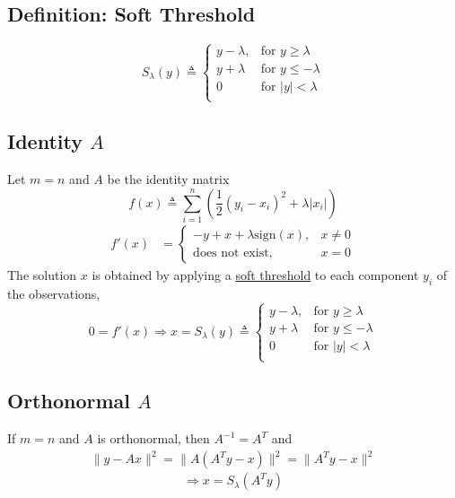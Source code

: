 \documentclass[11pt]{elegantbook}
\begin{document}
\subsection{Definition: Soft Threshold}
\begin{definition}
    $$S_\lambda (y)\triangleq\left\{\begin{matrix}
        y-\lambda,&\text{for }y\geq \lambda\\
        y+\lambda&\text{for }y\leq -\lambda\\
        0&\text{for }|y|< \lambda\\
    \end{matrix}\right.$$
\end{definition}
\subsection{Identity $A$}
Let $m = n$ and $A$ be the identity matrix
$$
f(x) \triangleq \sum_{i=1}^n\left(\frac{1}{2}(y_i-x_i)^2+\lambda |x_i|\right)
$$
\begin{equation}
    \begin{aligned}
        f'(x)&=\left\{\begin{matrix}
            -y+x+\lambda \text{sign}(x),&x\neq 0\\
            \text{does not exist},&x=0
        \end{matrix}\right.
    \end{aligned}
    \nonumber
\end{equation}
The solution $x$ is obtained by applying a \underline{soft threshold} to each component $y_i$ of the observations,
$$0=f'(x) \Rightarrow x=S_\lambda (y)\triangleq\left\{\begin{matrix}y-\lambda,&\text{for }y\geq \lambda\\
y+\lambda&\text{for }y\leq -\lambda\\
0&\text{for }|y|< \lambda\\
\end{matrix}\right.$$

\subsection{Orthonormal $A$}
If $m = n$ and $A$ is orthonormal, then $A^{-1} = A^T$ and
\begin{equation}
    \begin{aligned}
        \|y-Ax\|^2=\|A(A^Ty-x)\|^2=\|A^Ty-x\|^2
    \end{aligned}
    \nonumber
\end{equation}
$$\Rightarrow x=S_\lambda (A^Ty)$$
\end{document}
